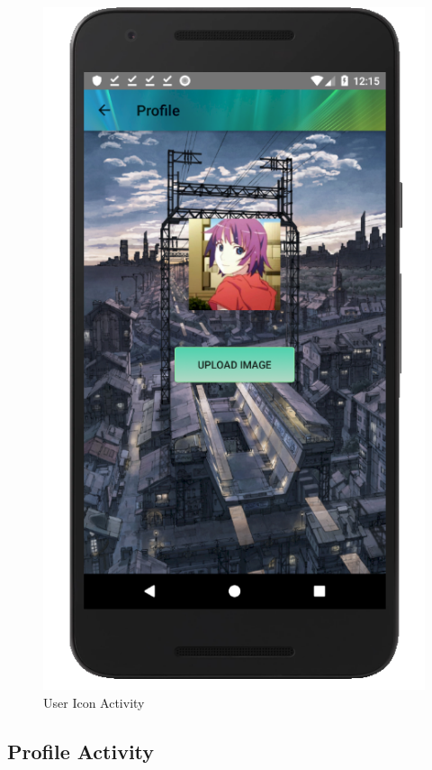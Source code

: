 \documentclass[12pt]{article}
\begin{document}
\begin{figure}
	\includegraphics[scale=0.25]{UserIcon.png}
	\caption{\label{fig:userIcon}User Icon Activity}
\end{figure}

\subsection{Profile Activity}
\end{document}
